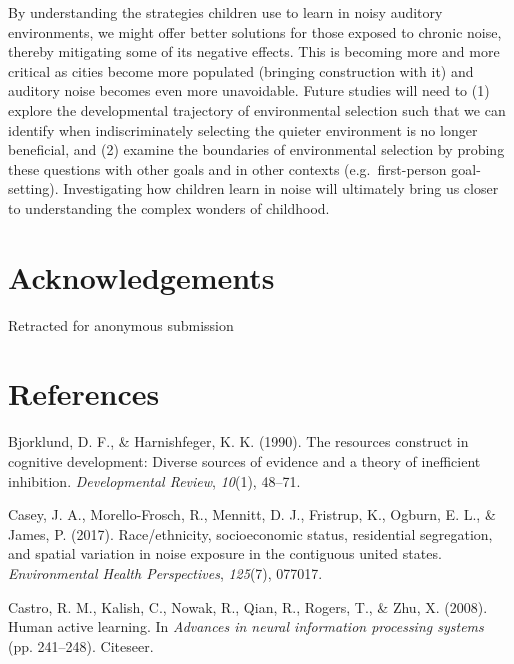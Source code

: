 \documentclass[10pt, letterpaper]{article}
\begin{document}
By understanding the strategies children use to learn in noisy auditory
environments, we might offer better solutions for those exposed to
chronic noise, thereby mitigating some of its negative effects. This is
becoming more and more critical as cities become more populated
(bringing construction with it) and auditory noise becomes even more
unavoidable. Future studies will need to (1) explore the developmental
trajectory of environmental selection such that we can identify when
indiscriminately selecting the quieter environment is no longer
beneficial, and (2) examine the boundaries of environmental selection by
probing these questions with other goals and in other contexts
(e.g.~first-person goal-setting). Investigating how children learn in
noise will ultimately bring us closer to understanding the complex
wonders of childhood.

\hypertarget{acknowledgements}{%
\section{Acknowledgements}\label{acknowledgements}}

Retracted for anonymous submission

\hypertarget{references}{%
\section{References}\label{references}}

\setlength{\parindent}{-0.1in} 
\setlength{\leftskip}{0.125in}

\noindent

\hypertarget{refs}{}
\leavevmode\hypertarget{ref-bjorklund1990}{}%
Bjorklund, D. F., \& Harnishfeger, K. K. (1990). The resources construct
in cognitive development: Diverse sources of evidence and a theory of
inefficient inhibition. \emph{Developmental Review}, \emph{10}(1),
48--71.

\leavevmode\hypertarget{ref-casey2017}{}%
Casey, J. A., Morello-Frosch, R., Mennitt, D. J., Fristrup, K., Ogburn,
E. L., \& James, P. (2017). Race/ethnicity, socioeconomic status,
residential segregation, and spatial variation in noise exposure in the
contiguous united states. \emph{Environmental Health Perspectives},
\emph{125}(7), 077017.

\leavevmode\hypertarget{ref-castro2008}{}%
Castro, R. M., Kalish, C., Nowak, R., Qian, R., Rogers, T., \& Zhu, X.
(2008). Human active learning. In \emph{Advances in neural information
processing systems} (pp. 241--248). Citeseer.
\end{document}
